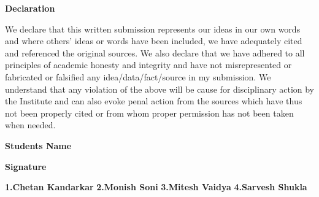 \newpage
\thispagestyle{empty}
\begin{center}
	\LARGE \textbf  {{Declaration}} 
\end{center}

\vspace{1.00cm}	
	We declare that this written submission represents our ideas in our own words and where others' ideas or words have been included, we have adequately cited and referenced the original sources. We also declare that we have adhered to all principles of academic honesty and integrity and have not misrepresented or fabricated or falsified any idea/data/fact/source in my submission. We understand that any violation of the above will be cause for disciplinary action by the Institute and can also evoke penal action from the sources which have thus not been properly cited or from whom proper permission has not been taken when needed. 
	
	\vspace{2.00cm}
	\begin{flushright}
		\begin{large} \textbf{ Students Name}\end{large} \hspace{20.00mm} \begin{large}\textbf{Signature}\end{large}
	\end{flushright}
	
	\begin{flushleft}	 
	\hspace{60.00mm} \vspace{0.3cm} \textbf{1.Chetan Kandarkar} 
		\vspace{0.3cm}
	\hspace{60.00mm} \textbf{2.Monish Soni}
		\vspace{0.3cm}
	\hspace{60.00mm} \textbf{3.Mitesh Vaidya} 
		\vspace{0.3cm}
	\hspace{60.00mm} \textbf{4.Sarvesh Shukla}
		\vspace{0.3cm}	    
	\end{flushleft} 
	 